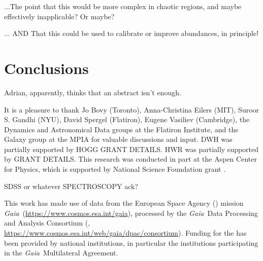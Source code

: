 \documentclass[modern]{aastex63}
\newcommand{\gaia}{\textsl{Gaia}}
\newcommand{\apogee}{\acronym{APOGEE}}
\newcommand{\sdss}{\acronym{SDSS}}
\begin{document}
...The point that this would be more complex in chaotic regions, and
maybe effectively inapplicable? Or maybe?

... AND That this could be used to calibrate or improve abundances, in
principle!

\section{Conclusions}
\label{sec:conclusions}

Adrian, apparently, thinks that an abstract isn't enough.


\acknowledgments
It is a pleasure to thank
  Jo Bovy (Toronto),
  Anna-Christina Eilers (MIT),
  Suroor S. Gandhi (NYU),
  David Spergel (Flatiron),
  Eugene Vasiliev (Cambridge),
  the Dynamics and Astronomical Data groups at the Flatiron Institute,
  and the Galaxy group at the MPIA
for valuable discussions and input.
DWH was partially supported by HOGG GRANT DETAILS.
HWR was partially supported by GRANT DETAILS.
This research was conducted in part at the Aspen Center for Physics,
which is supported by National Science Foundation grant .

SDSS or whatever SPECTROSCOPY ack?

This work has made use of data from the European Space Agency ()
mission \gaia\ (\url{https://www.cosmos.esa.int/gaia}), processed by the \gaia\
Data Processing and Analysis Consortium (,
\url{https://www.cosmos.esa.int/web/gaia/dpac/consortium}). Funding for the
\acronym{DPAC}
has been provided by national institutions, in particular the institutions
participating in the \gaia\ Multilateral Agreement.





\end{document}

